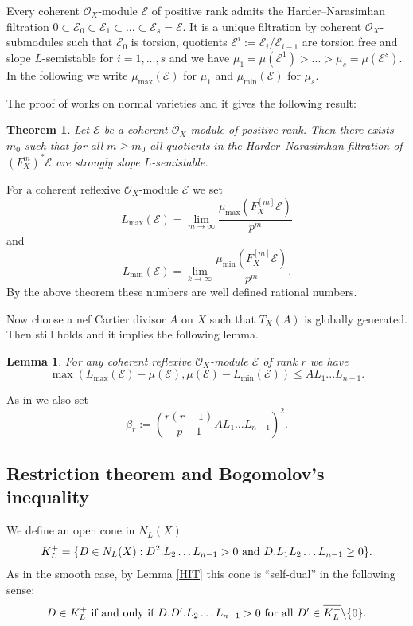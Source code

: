\documentclass[12pt]{article}
\theoremstyle{plain}
\newtheorem{Theorem}[Thm]{\sc Theorem}
\newtheorem{Lemma}[Thm]{\sc Lemma}
\theoremstyle{definition}
\theoremstyle{remark}
\newcommand{\cE}{{\mathcal E}}
\newcommand{\cO}{{\mathcal O}}
\begin{document}
Every coherent $\cO_X$-module $\cE$ of positive rank admits the Harder--Narasimhan filtration 
$0\subset \cE_0\subset \cE_1\subset ...\subset \cE_s=\cE$. It is a unique filtration by coherent 
$\cO_X$-submodules such that $\cE_0$ is torsion, quotients $\cE^i:=\cE_i/\cE_{i-1}$ are torsion free
and slope $L$-semistable  for $i=1,...,s$ and we have
$\mu_1=\mu  (\cE^1)>...>\mu_s=\mu  (\cE^s)$. In the following we write $\mu_{\max} (\cE)$ for $\mu_1$ and  $\mu_{\min} (\cE)$ for $\mu_s$. 

 


The proof of \cite[Theorem 2.7]{La1}  works on normal varieties and it gives the following result:

\begin{Theorem}
	Let $\cE$ be a coherent $\cO_X$-module  of positive rank. Then there exists $m_0$ such that for all $m\ge m_0$ all quotients in the Harder--Narasimhan filtration of $(F_X^{m})^*\cE$ are strongly slope $L$-semistable.
\end{Theorem}


For a coherent reflexive $\cO_X$-module $\cE$ we set
$$L_{\max} (\cE)
=\lim _{m\to \infty} \frac{\mu _{\max} (F_X^{[m]}\cE)}{p^m}$$
and
$$L _{\min} (\cE) =\lim _{k\to \infty} \frac{\mu _{\min} (F_X^{[m]}\cE)}{ p^m}.$$
By the above theorem these numbers are well defined rational numbers.

\medskip


Now choose a nef Cartier divisor $A$ on $X$ such that 
$T_X(A)$ is globally generated. Then \cite[Corollary 2.5]{La1} still holds and it implies the following
lemma.

\begin{Lemma}\label{bounds-for-L_max}
	For any coherent reflexive $\cO_X$-module $\cE$ of rank $r$ we have
	$$\max (L_{\max}(\cE) -\mu (\cE), \mu (\cE) -L_{\min} (\cE))\le AL_1...L_{n-1}. $$
\end{Lemma}


As in \cite{La1} we also set 
$$\beta _r :=
\left( \frac{r(r-1)}{p-1}AL_1\dots L_{n-1}\right) ^2.
$$



\subsection{Restriction theorem and Bogomolov's inequality}\label{Section:Restriction+Bogomolov}

We define an open cone in $N_L (X)$
$$K^+_L=\{ D\in N_L (X): D^2.L_2\dots L_{n-1}>0 \hbox{ and }
D.L_1L_2\dots L_{n-1}\ge 0\} .$$
As in the smooth case, by Lemma \ref{HIT}
this cone  is ``self-dual'' 
in the following sense:
$$D\in K_L^{+} \hbox{ if and only if } D.D'.L_2\dots L_{n-1}>0\hbox{ for all }
D'\in {\overline{K_L^+}}\backslash \{ 0\} .$$
\end{document}
